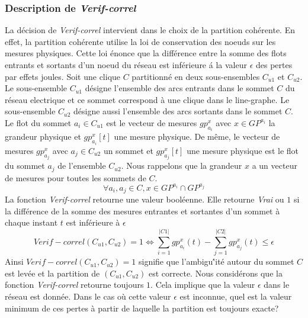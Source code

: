\subsubsection{Description de {\em Verif-correl}}
La d\'ecision de  {\em Verif-correl} intervient dans le choix de la partition coh\'erente.
En effet, la partition coh\'erente utilise la loi de conservation des noeuds \cite{loiDeConservation} sur les mesures physiques. Cette loi \'enonce que la diff\'erence entre la somme des flots entrants et sortants d'un noeud du r\'eseau est inf\'erieure \'a la valeur $\epsilon$ des pertes par effets joules.
\newline
Soit une clique $C$ partitionn\'e en deux sous-ensembles $C_{u1}$ et $C_{u2}$. 
Le sous-ensemble $C_{u1}$ d\'esigne l'ensemble des arcs entrants dans le sommet $C$ du r\'eseau electrique et ce sommet correspond \`a une clique dans le line-graphe.
Le sous-ensemble $C_{u2}$ d\'esigne aussi l'ensemble des arcs sortants dans le sommet $C$.
Le flot du sommet $a_i \in C_{u1}$ est le vecteur de mesures $gp_{a_i}^{x}$ avec  $x \in GP^{a_i}$ la grandeur physique et $gp_{a_i}^{x}[t]$ une mesure physique. 
De m\^eme, le vecteur de mesures $gp_{a_j}^{x}$  avec $a_j \in C_{u2}$ un sommet et $gp_{a_j}^{x}[t]$ une mesure physique est le flot du sommet $a_j$ de l'ensemble $C_{u2}$. 
Nous rappelons que la grandeur $x$ a un vecteur de mesures pour toutes les sommets de $C$.
$$ \forall a_i , a_j \in C, x \in GP^{a_i} \cap GP^{a_j} $$
La fonction {\em Verif-correl} retourne une valeur bool\'eenne. Elle retourne {\em Vrai} ou $1$ si la diff\'erence de la somme des mesures entrantes et sortantes d'un sommet \`a chaque instant $t$ est inf\'erieure \`a $\epsilon$
$$ Verif-correl(C_{u1}, C_{u2}) = 1 \Leftrightarrow  \sum_{i = 1}^{|C1|} gp_{a_i}^{x}(t) - \sum_{j = 1}^{|C2|} gp_{a_j}^{x}(t)  \le \epsilon $$
Ainsi $ Verif-correl(C_{u1}, C_{u2}) = 1$ signifie que l'ambigu\''{i}t\'e autour du sommet $C$ est lev\'ee et la partition de $(C_{u1}, C_{u2})$ est correcte.
\newline
Nous consid\'erons que la fonction {\em Verif-correl} retourne toujours $1$. Cela implique que la valeur $\epsilon$ dans le r\'eseau est donn\'ee. Dans le cas o\`u cette valeur $\epsilon$ est inconnue, quel est la valeur minimum de ces pertes  \`a partir de laquelle la partition est toujours exacte?




